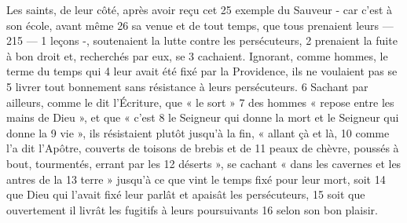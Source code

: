 Les saints, de leur côté, après avoir reçu cet	 
25	 	exemple du Sauveur - car c'est à son école, avant même	 
26	 	sa venue et de tout temps, que tous prenaient leurs	 
 	--- 215 ---	 
1	 	leçons -, soutenaient la lutte contre les persécuteurs,	 
2	 	prenaient la fuite à bon droit et, recherchés par eux, se	 
3	 	cachaient. Ignorant, comme hommes, le terme du temps qui	 
4	 	leur avait été fixé par la Providence, ils ne voulaient pas se	 
5	 	livrer tout bonnement sans résistance à leurs persécuteurs.	 
6	 	Sachant par ailleurs, comme le dit l'Écriture, que « le sort »	 
7	 	des hommes « repose entre les mains de Dieu », et que « c'est	 
8	 	le Seigneur qui donne la mort et le Seigneur qui donne la	 
9	 	vie », ils résistaient plutôt jusqu'à la fin, « allant çà et là,	 
10	 	comme l'a dit l'Apôtre, couverts de toisons de brebis et de	 
11	 	peaux de chèvre, poussés à bout, tourmentés, errant par les	 
12	 	déserts », se cachant « dans les cavernes et les antres de la	 
13	 	terre » jusqu'à ce que vint le temps fixé pour leur mort, soit	 
14	 	que Dieu qui l'avait fixé leur parlât et apaisât les persécuteurs,	 
15	 	soit que ouvertement il livrât les fugitifs à leurs poursuivants	 
16	 	selon son bon plaisir.